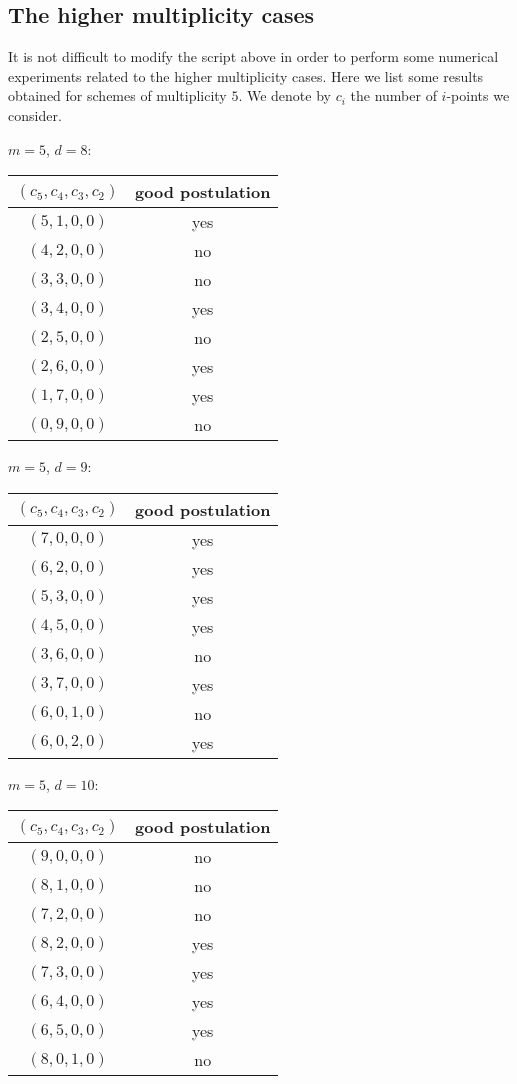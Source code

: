 \documentclass{amsart}
\theoremstyle{plain}
\theoremstyle{definition}
\begin{document}
\subsection{The higher multiplicity cases}

It is not difficult to modify the script above in order to perform
some numerical experiments related to the higher multiplicity cases.
Here we list some results obtained 
for schemes of multiplicity $5$. We
denote by $c_i$ the number of $i$-points we consider.

$m=5$, $d=8$:

\begin{center}
\begin{tabular}{|c|c|}
\hline
$(c_5,c_4,c_3,c_2)$ & good postulation\\
\hline
$(5,1,0,0)$& yes \\
$(4,2,0,0)$& no \\
$(3,3,0,0)$& no \\
$(3,4,0,0)$& yes \\
$(2,5,0,0)$& no \\
$(2,6,0,0)$& yes \\
$(1,7,0,0)$& yes \\
$(0,9,0,0)$& no \\
\hline
\end{tabular}
\end{center}

$m=5$, $d=9$:
\begin{center}
\begin{tabular}{|c|c|}
\hline
$(c_5,c_4,c_3,c_2)$ & good postulation\\
\hline
$( 7, 0, 0, 0)$& yes\\
$( 6, 2, 0, 0)$& yes\\
$(5, 3, 0, 0)$& yes\\
$( 4, 5, 0, 0)$& yes\\
$(3,6,0,0)$& no\\
$(3, 7, 0, 0)$& yes\\
$(6,0,1,0)$& no\\
$(6,0,2,0)$& yes\\
\hline
\end{tabular}
\end{center}

$m=5$, $d=10$:
\begin{center}
\begin{tabular}{|c|c|}
\hline
$(c_5,c_4,c_3,c_2)$ & good postulation\\
\hline
$(9, 0, 0, 0)$& no\\
$(8, 1, 0, 0)$& no\\
$(7, 2, 0, 0)$& no\\
$(8, 2, 0, 0)$& yes\\
$(7, 3, 0, 0)$& yes\\
$(6, 4, 0, 0)$& yes\\
$(6, 5, 0, 0)$& yes\\
$(8, 0, 1, 0)$& no\\
\hline
\end{tabular}
\end{center}
\end{document}
